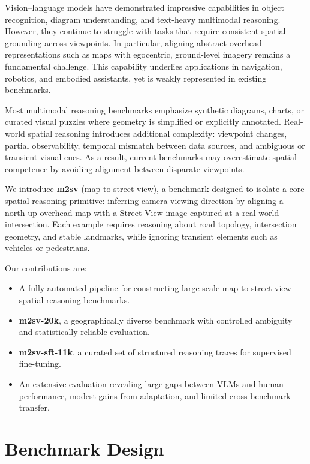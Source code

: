 \documentclass{article}
\begin{document}
Vision--language models have demonstrated impressive capabilities in object
recognition, diagram understanding, and text-heavy multimodal reasoning.
However, they continue to struggle with tasks that require consistent spatial
grounding across viewpoints. In particular, aligning abstract overhead
representations such as maps with egocentric, ground-level imagery remains a
fundamental challenge. This capability underlies applications in navigation,
robotics, and embodied assistants, yet is weakly represented in existing
benchmarks.

Most multimodal reasoning benchmarks emphasize synthetic diagrams, charts, or
curated visual puzzles where geometry is simplified or explicitly annotated.
Real-world spatial reasoning introduces additional complexity: viewpoint changes,
partial observability, temporal mismatch between data sources, and ambiguous or
transient visual cues. As a result, current benchmarks may overestimate spatial
competence by avoiding alignment between disparate viewpoints.

We introduce \textbf{m2sv} (map-to-street-view), a benchmark designed to isolate a
core spatial reasoning primitive: inferring camera viewing direction by aligning
a north-up overhead map with a Street View image captured at a real-world
intersection. Each example requires reasoning about road topology, intersection
geometry, and stable landmarks, while ignoring transient elements such as
vehicles or pedestrians.

Our contributions are:
\begin{itemize}
  \item A fully automated pipeline for constructing large-scale map-to-street-view
  spatial reasoning benchmarks.
  \item \textbf{m2sv-20k}, a geographically diverse benchmark with controlled
  ambiguity and statistically reliable evaluation.
  \item \textbf{m2sv-sft-11k}, a curated set of structured reasoning traces for
  supervised fine-tuning.
  \item An extensive evaluation revealing large gaps between VLMs and human
  performance, modest gains from adaptation, and limited cross-benchmark transfer.
\end{itemize}

\section{Benchmark Design}
\end{document}
